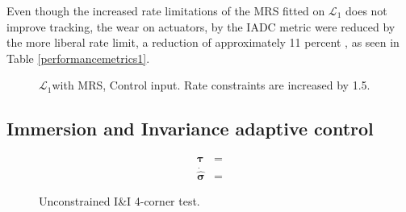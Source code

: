 Even though the increased rate limitations of the MRS fitted on $\mathcal{L}_1$ does not improve tracking, the wear on actuators, by the IADC metric were reduced by the more liberal rate limit, a reduction of approximately 11 percent , as seen in Table \ref{performancemetrics1}.

\begin{figure}[!h]
    \centering
    \caption{ $\mathcal{L}_1$with MRS, Control input. Rate constraints are increased by 1.5. }
\end{figure}\label{fig:L1MRS2tau}

\newpage
\subsection{Immersion and Invariance adaptive control}

\begin{align}
    \boldsymbol{\tau} &= \\
    \boldsymbol{\dot{\hat{\sigma}}} &= 
\end{align}

\begin{figure}[!h]
    \centering
    \caption{Unconstrained I\&I 4-corner test. }
\end{figure}\label{fig:II4corner}

